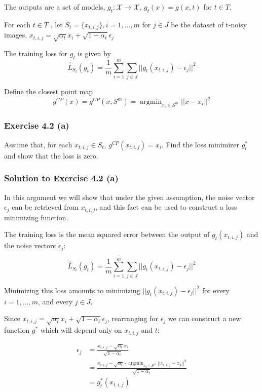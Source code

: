 \documentclass[
10pt, %
a4paper, %
oneside, %
headinclude,footinclude, %
BCOR5mm, %
]{scrartcl}
\DeclareMathOperator*{\argmin}{argmin} %
\begin{document}
The outputs are a set of models, $g_t : \mathcal{X} \rightarrow \mathcal{X}$, $g_t (x) = g(x, t)$ for $t \in T$.

For each $t \in T$ , let $S_t = \{x_{t,i,j}\}, i = 1, \ldots , m$ for $j \in J$ be the dataset of t-noisy images, $x_{t,i,j} = \sqrt{\alpha_t} x_i + \sqrt{1 - \alpha_t} \epsilon_j$

The training loss for $g_t$ is given by
\begin{equation*}
\hat{L}_{S_t}(g_t) = \frac{1}{m} \sum_{i=1}^{m} \sum_{j \in J} ||g_t (x_{t,i,j} ) - \epsilon_j ||^2
\end{equation*}

Define the closest point map
\begin{equation*}
  g^{CP}(x) = g^{CP}(x, S^m) = \argmin_{x_i \in S^m} ||x - x_i||^2
\end{equation*}

\subsubsection*{Exercise 4.2 (a)}
Assume that, for each $x_{t,i,j} \in S_t$, $g^{CP}(x_{t,i,j}) = x_i$. Find the loss minimizer $g^*_t$ and show that the loss is zero.

\subsubsection*{Solution to Exercise 4.2 (a)}
In this argument we will show that under the given assumption, the noise vector $\epsilon_j$ can be retrieved from $x_{t,i,j}$, and this fact can be used to construct a loss minimizing function.

The training loss is the mean squared error between the output of $g_t(x_{t,i,j})$ and the noise vectors $\epsilon_j$:

\begin{equation*}
  \hat{L}_{S_t}(g_t) = \frac{1}{m} \sum_{i=1}^{m} \sum_{j \in J} ||g_t (x_{t,i,j} ) - \epsilon_j ||^2
\end{equation*}

Minimizing this loss amounts to minimizing $||g_t (x_{t,i,j})-\epsilon_j||^2$ for every $i = 1, ..., m$, and every $j \in J$.

Since $x_{t,i,j} = \sqrt{\alpha_t}x_i + \sqrt{1-\alpha_t}\epsilon_j$, rearranging for $\epsilon_j$ we can construct a new function $g^*$ which will depend only on $x_{t,i,j}$ and $t$:

\begin{align*}
  \epsilon_j &= \frac{x_{t,i,j} - \sqrt{\alpha_t}x_i}{\sqrt{1-\alpha_t}} \\
   &= \frac{x_{t,i,j} - \sqrt{\alpha_t} \cdot \argmin_{x_k \in S^m} ||x_{t,i,j}-x_k||^2}{\sqrt{1-\alpha_t}} \\
  &= g^*_t(x_{t,i,j})
\end{align*}
\end{document}
